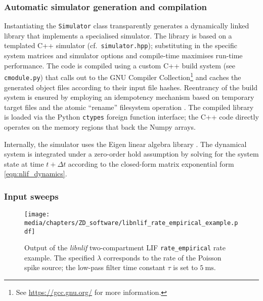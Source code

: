 \subsubsection{Automatic simulator generation and compilation}
Instantiating the \texttt{Simulator} class transparently generates a dynamically linked library that implements a specialised simulator.
The library is based on a templated \citep[Chapter~23]{stroustrup2013programming} C++ simulator (cf.~\texttt{simulator.hpp});
substituting in the specific system matrices and simulator options and compile-time maximises run-time performance.
The code is compiled using a custom C++ build system (see \texttt{cmodule.py}) that calls out to the GNU Compiler Collection\footnote{See \url{https://gcc.gnu.org/} for more information.} and caches the generated object files according to their input file hashes.
Reentrancy of the build system is ensured by employing an idempotency mechanism based on temporary target files and the atomic \enquote{rename} filesystem operation \citep[pp.~1816-1820]{2018ieee}.
The compiled library is loaded via the Python \texttt{ctypes} foreign function interface; the C++ code directly operates on the memory regions that back the Numpy arrays.


Internally, the simulator uses the Eigen linear algebra library \citep{eigenweb}.
The dynamical system is integrated under a zero-order hold assumption by solving for the system state at time $t + \Delta t$ according to the closed-form matrix exponential form \cref{eqn:nlif_dynamics}.

\subsubsection{Input sweeps}

\begin{figure}
	\centering
	\texttt{[image: media/chapters/ZD\_software/libnlif\_rate\_empirical\_example.pdf]}
	\caption[Output of the \emph{libnlif} \enquote{rate\_empirical} function for different noise parameters]{Output of the \emph{libnlif} two-compartment LIF \texttt{rate\_empirical} rate example. The specified $\lambda$ corresponds to the rate of the Poisson spike source; the low-pass filter time constant $\tau$ is set to $\SI{5}{\milli\second}$.}
	\label{fig:libnlif_rate_empirical_example}
\end{figure}

